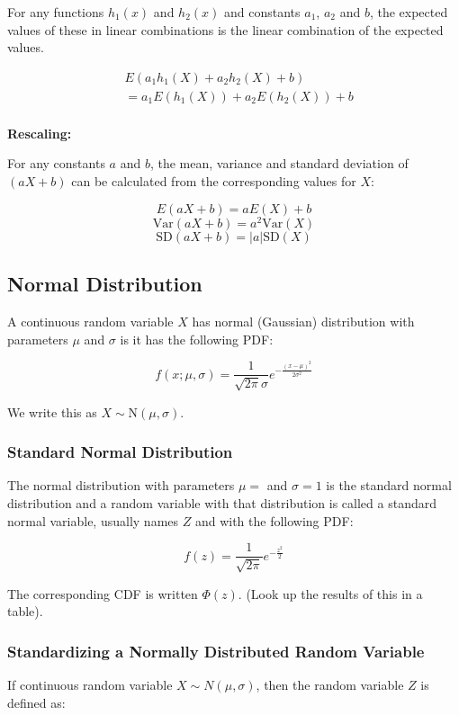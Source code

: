 For any functions $h_1(x)$ and $h_2(x)$ and constants $a_1$, $a_2$ and $b$, the expected values of these in linear combinations is the linear combination of the expected values.

\begin{align*}
      & E(a_1h_1(X) + a_2h_2(X) + b)      \\
      & = a_1E(h_1(X)) + a_2E(h_2(X)) + b \\
\end{align*}

\textbf{Rescaling:}

For any constants $a$ and $b$, the mean, variance and standard deviation of $(aX+b)$ can be calculated from the corresponding values for $X$:

$$ E(aX+b) = aE(X) + b $$
$$ \text{Var}(aX+b) = a^2\text{Var}(X) $$
$$ \text{SD}(aX+b) = |a|\text{SD}(X) $$

\subsection*{Normal Distribution}

A continuous random variable $X$ has normal (Gaussian) distribution with parameters $\mu$ and $\sigma$ is it has the following PDF:

$$ f(x; \mu,\sigma) = \frac{1}{\sqrt{2\pi}\sigma} e^{-\frac{(x-\mu)^2}{2\sigma^2}} $$

We write this as $X \sim \text{N}(\mu,\sigma)$.

\subsubsection*{Standard Normal Distribution}

The normal distribution with parameters $\mu = $ and $\sigma = 1$ is the standard normal distribution and a random variable with that distribution is called a standard normal variable, usually names $Z$ and with the following PDF:

$$ f(z) = \frac{1}{\sqrt{2\pi}} e^{-\frac{z^2}{2}} $$

The corresponding CDF is written $\Phi(z)$. (Look up the results of this in a table).

\subsubsection*{Standardizing a Normally Distributed Random Variable}

If continuous random variable $X \sim N(\mu, \sigma)$, then the random variable $Z$ is defined as:

